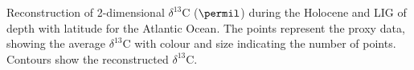 Reconstruction of 2-dimensional $\delta^{13}$C ($\permil$) during the Holocene and LIG of depth with latitude for the Atlantic Ocean. The points represent the proxy data, showing the average $\delta^{13}$C with colour and size indicating the number of points. Contours show the reconstructed $\delta^{13}$C.
